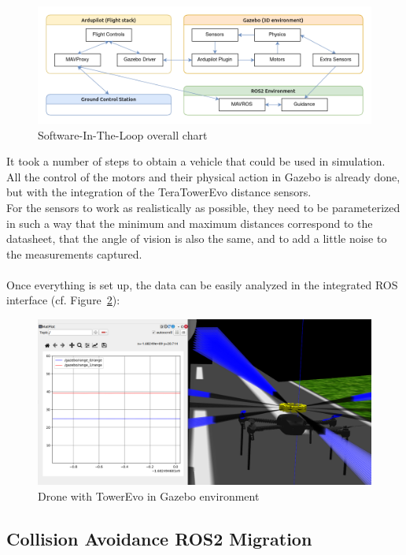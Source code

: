 \begin{figure}[H]
    \centering
    \includegraphics[width=\linewidth]{./projects/ardupilot/sitl_overall.png}
    \caption{Software-In-The-Loop overall chart\cite{sitl_explained}}
    \label{fig:sitl-overall}
\end{figure}

It took a number of steps to obtain a vehicle that could be used in simulation. All the control of the motors and their physical action in Gazebo is already done, but with the integration of the TeraTowerEvo distance sensors.
\\ 
For the sensors to work as realistically as possible, they need to be parameterized in such a way that the minimum and maximum distances correspond to the datasheet, that the angle of vision is also the same, and to add a little noise to the measurements captured.
\\ \\
Once everything is set up, the data can be easily analyzed in the integrated ROS interface (cf. Figure~\ref{fig:drone-gazebo}):
\begin{figure}[H]
    \centering
    \includegraphics[width=0.75\linewidth]{./projects/ardupilot/gazebo_drone.png}
    \caption{Drone with TowerEvo in Gazebo environment}
    \label{fig:drone-gazebo}
\end{figure}

\subsection{Collision Avoidance ROS2 Migration}
